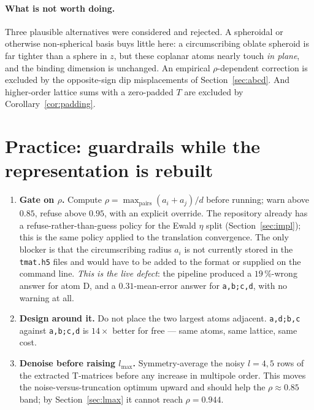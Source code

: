 \documentclass[11pt,a4paper]{article}
\newcommand{\lmax}{\ensuremath{l_{\max}}}
\newcommand{\code}[1]{\texttt{\small #1}}
\theoremstyle{plain}
\theoremstyle{definition}
\begin{document}
\paragraph{What is not worth doing.} Three plausible alternatives were considered
and rejected. A spheroidal or otherwise non-spherical basis buys little here: a
circumscribing oblate spheroid is far tighter than a sphere in $z$, but these
coplanar atoms nearly touch \emph{in plane}, and the binding dimension is
unchanged. An empirical $\rho$-dependent correction is excluded by the
opposite-sign dip misplacements of Section~\ref{sec:abcd}. And higher-order
lattice sums with a zero-padded $T$ are excluded by
Corollary~\ref{cor:padding}.

\section{Practice: guardrails while the representation is rebuilt}
\label{sec:guardrails}

\begin{enumerate}[leftmargin=*,itemsep=3pt]
\item \textbf{Gate on $\rho$.} Compute $\rho = \max_{\text{pairs}}(a_i + a_j)/d$
      before running; warn above $0.85$, refuse above $0.95$, with an explicit
      override. The repository already has a refuse-rather-than-guess policy for
      the Ewald $\eta$ split (Section~\ref{sec:impl}); this is the same policy
      applied to the translation convergence. The only blocker is that the
      circumscribing radius $a_i$ is not currently stored in the \code{tmat.h5}
      files and would have to be added to the format or supplied on the command
      line. \emph{This is the live defect}: the pipeline produced a $19\,\%$-wrong
      answer for atom D, and a $0.31$-mean-error answer for \texttt{a,b;c,d},
      with no warning at all.
\item \textbf{Design around it.} Do not place the two largest atoms adjacent.
      \texttt{a,d;b,c} against \texttt{a,b;c,d} is $14\times$ better for free ---
      same atoms, same lattice, same cost.
\item \textbf{Denoise before raising $\lmax$.} Symmetry-average the noisy
      $l = 4, 5$ rows of the extracted T-matrices before any increase in
      multipole order. This moves the noise-versus-truncation optimum upward and
      should help the $\rho \approx 0.85$ band; by Section~\ref{sec:lmax} it
      cannot reach $\rho = 0.944$.
\end{enumerate}
\end{document}
